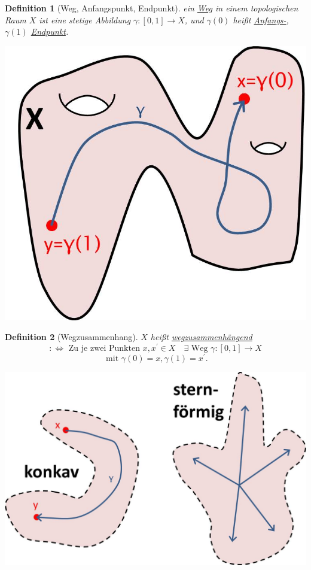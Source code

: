 \documentclass[a4paper,11pt,notitlepage]{report}
\newtheorem{definition}{Definition}[chapter]
\begin{document}
\begin{definition}[Weg, Anfangspunkt, Endpunkt]
	ein \underline{Weg} in einem topologischen Raum $X$ ist eine stetige Abbildung $\gamma \colon [0,1] \rightarrow X$, und $\gamma(0)$ heißt \underline{Anfangs-}, $\gamma(1)$ \underline{Endpunkt}.
	\newline
\end{definition}
\begin{center}
	\includegraphics[scale=0.4]{images/Weg.jpg}
\end{center}

\begin{definition}[Wegzusammenhang]
	$X$ heißt \underline{wegzusammenhängend} $$:\Leftrightarrow \text{ Zu je zwei Punkten } x,x^\prime \in X \quad \exists \text{ Weg } \gamma \colon [0,1] \rightarrow X$$ $$\text{ mit } \gamma(0)=x, \gamma(1)=x^\prime.$$
\end{definition}
\begin{center}
\includegraphics[scale=0.4]{images/Wegzshgd.jpg}
\end{center}
\end{document}
